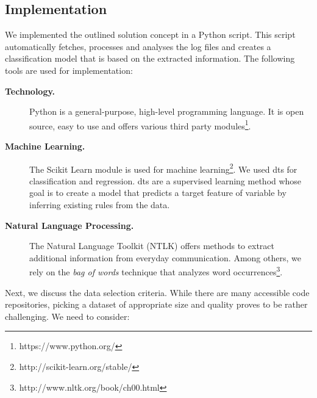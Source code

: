 \subsection{Implementation}
\label{sec:impl}

We implemented the outlined solution concept in a Python script. This script automatically fetches, processes and analyses the log files and creates a classification model that is based on the extracted information. The following tools are used for implementation:

\begin{description}

\item[\textbf{Technology.}] Python is a general-purpose, high-level programming language. It is open source, easy to use and offers various third party modules\footnote{https://www.python.org/}.

\item[\textbf{Machine Learning.}] The Scikit Learn module is used for machine learning\footnote{http://scikit-learn.org/stable/}. We used \glspl*{dt} for classification and regression. \Glspl*{dt} are a supervised learning method whose goal is to create a model that predicts a target feature of variable by inferring existing rules from the data.

\item[\textbf{Natural Language Processing.}] The Natural Language Toolkit (NTLK) offers methods to extract additional information from everyday communication. Among others, we rely on the \emph{bag of words} technique that analyzes word occurrences\footnote{http://www.nltk.org/book/ch00.html}.

\end{description}

Next, we discuss the data selection criteria. While there are many accessible code repositories, picking a dataset of appropriate size and quality proves to be rather challenging. We need to consider:

